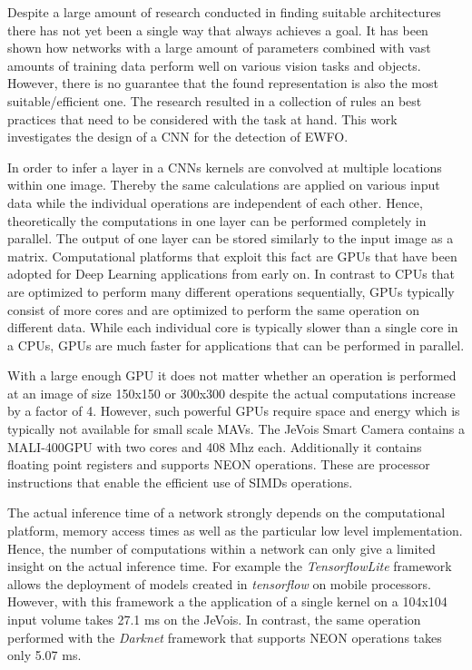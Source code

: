 Despite a large amount of research conducted in finding suitable architectures there has not yet been a single way that always achieves a goal. It has been shown how networks with a large amount of parameters combined with vast amounts of training data perform well on various vision tasks and objects. However, there is no guarantee that the found representation is also the most suitable/efficient one. The research resulted in a collection of rules an best practices that need to be considered with the task at hand. This work investigates the design of a \ac{CNN} for the detection of \ac{EWFO}.


In order to infer a layer in a \acp{CNN} kernels are convolved at multiple locations within one image. Thereby the same calculations are applied on various input data while the individual operations are independent of each other. Hence, theoretically the computations in one layer can be performed completely in parallel. The output of one layer can be stored similarly to the input image as a matrix. Computational platforms that exploit this fact are \acp{GPU} that have been adopted for Deep Learning applications from early on. In contrast to \acp{CPU} that are optimized to perform many different operations sequentially, \acp{GPU} typically consist of more cores and are optimized to perform the same operation on different data. While each individual core is typically slower than a single core in a \acp{CPU}, \acp{GPU} are much faster for applications that can be performed in parallel.

With a large enough \ac{GPU} it does not matter whether an operation is performed at an image of size 150x150 or 300x300 despite the actual computations increase by a factor of 4. However, such powerful \acp{GPU} require space and energy which is typically not available for small scale \acp{MAV}. The JeVois Smart Camera contains a MALI-400GPU with two cores and 408 Mhz each. Additionally it contains floating point registers and supports NEON operations. These are processor instructions that enable the efficient use of \acp{SIMD} operations.

The actual inference time of a network strongly depends on the computational platform, memory access times as well as the particular low level implementation. Hence, the number of computations within a network can only give a limited insight on the actual inference time. For example the \textit{TensorflowLite} framework allows the deployment of models created in \textit{tensorflow} on mobile processors. However, with this framework a the application of a single kernel on a 104x104 input volume takes 27.1 ms on the JeVois. In contrast, the same operation performed with the \textit{Darknet} framework that supports NEON operations takes only 5.07 ms. 


